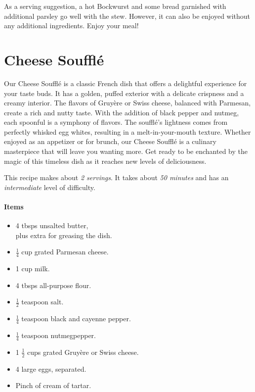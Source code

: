 As a serving suggestion, a hot Bockwurst and some bread garnished with additional parsley go well with the stew. However, it can also be enjoyed without any additional ingredients. Enjoy your meal!

\section{Cheese Soufflé}
\label{cheesesouffle}
Our Cheese Soufflé is a classic French dish that offers a delightful experience for your taste buds. It has a golden, puffed exterior with a delicate crispness and a creamy interior. The flavors of Gruyère or Swiss cheese, balanced with Parmesan, create a rich and nutty taste. With the addition of black pepper and nutmeg, each spoonful is a symphony of flavors. The soufflé's lightness comes from perfectly whisked egg whites, resulting in a melt-in-your-mouth texture. Whether enjoyed as an appetizer or for brunch, our Cheese Soufflé is a culinary masterpiece that will leave you wanting more. Get ready to be enchanted by the magic of this timeless dish as it reaches new levels of deliciousness.

This recipe makes about \emph{2 servings}. It takes about \emph{50 minutes} and has an \emph{intermediate} level of difficulty. 

\paragraph{Items}
\begin{itemize}[noitemsep]
	\item[\ding{182}] 4 tbsps unsalted butter, \\ plus extra for greasing the dish.
	\item[\ding{183}] $\frac{1}{4}$ cup grated Parmesan cheese.
	\item[\ding{184}] 1 cup milk.
	\item[\ding{185}] 4 tbsps all-purpose flour.
	\item[\ding{186}] $\frac{1}{2}$ teaspoon salt.
	\item[\ding{187}] $\frac{1}{4}$ teaspoon black and cayenne pepper.
	\item[\ding{188}] $\frac{1}{4}$ teaspoon nutmegpepper.
	\item[\ding{189}] 1 $\frac{1}{2}$ cups grated Gruyère or Swiss cheese.
	\item[\ding{190}] 4 large eggs, separated.
	\item[\ding{191}] Pinch of cream of tartar.	
\end{itemize}

